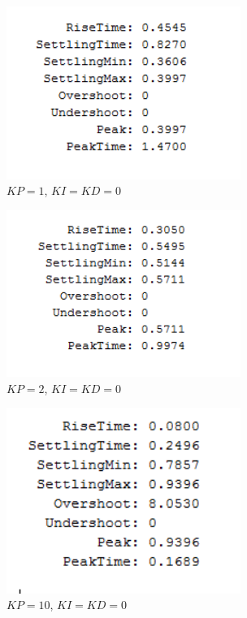 \documentclass[12pt]{article}
\begin{document}
\bigskip

\begin{figure}[h!] %
   \centering
   \includegraphics[width=3in]{1_100.png} 
   \caption{$KP = 1$, $KI = KD = 0$}
   \label{fig:example}
\end{figure}

\newpage

\begin{figure}[h!] %
   \centering
   \includegraphics[width=3in]{1_200.png} 
   \caption{$KP = 2$, $KI = KD = 0$}
   \label{fig:example}
\end{figure}

\bigskip

\begin{figure}[h!] %
   \centering
   \includegraphics[width=3in]{1_1000.png} 
   \caption{$KP = 10$, $KI = KD = 0$}
   \label{fig:example}
\end{figure}
\end{document}
